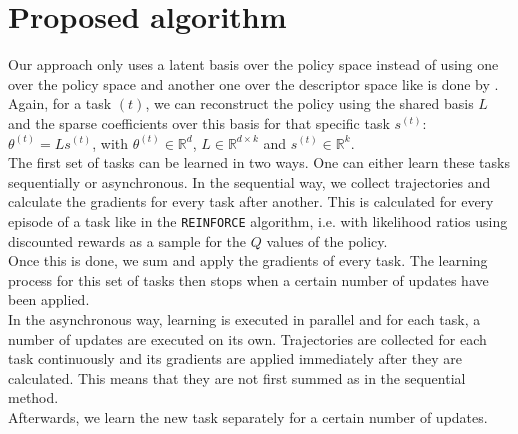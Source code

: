 \documentclass[a4paper]{article}
\begin{document}
\section{Proposed algorithm}
Our approach only uses a latent basis over the policy space instead of using one over the policy space and another one over the descriptor space like is done by \cite{Isele2016UsingLearning}. Again, for a task $(t)$, we can reconstruct the policy using the shared basis $L$ and the sparse coefficients over this basis for that specific task $s^{(t)}$: $\theta^{(t)} = Ls^{(t)}$, with $\theta^{(t)} \in \mathbb{R}^d$, $L \in \mathbb{R}^{d \times k}$ and $s^{(t)} \in \mathbb{R}^k$.\\

The first set of tasks can be learned in two ways. One can either learn these tasks sequentially or asynchronous. In the sequential way, we collect trajectories and calculate the gradients for every task after another. This is calculated for every episode of a task like in the \texttt{REINFORCE} algorithm, i.e. with likelihood ratios using discounted rewards as a sample for the $Q$ values of the policy.\\
Once this is done, we sum and apply the gradients of every task. The learning process for this set of tasks then stops when a certain number of updates have been applied.\\
In the asynchronous way, learning is executed in parallel and for each task, a number of updates are executed on its own. Trajectories are collected for each task continuously and its gradients are applied immediately after they are calculated. This means that they are not first summed as in the sequential method.\\
Afterwards, we learn the new task separately for a certain number of updates.
\end{document}
